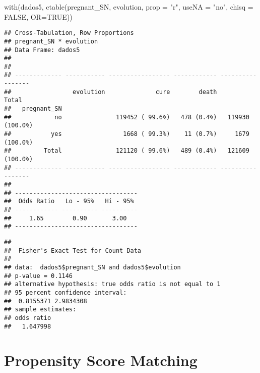\documentclass[
]{article}
\newenvironment{Shaded}{\begin{snugshade}}{\end{snugshade}}
\newcommand{\AttributeTok}[1]{\textcolor[rgb]{0.77,0.63,0.00}{#1}}
\newcommand{\CommentTok}[1]{\textcolor[rgb]{0.56,0.35,0.01}{\textit{#1}}}
\newcommand{\ConstantTok}[1]{\textcolor[rgb]{0.00,0.00,0.00}{#1}}
\newcommand{\FunctionTok}[1]{\textcolor[rgb]{0.00,0.00,0.00}{#1}}
\newcommand{\NormalTok}[1]{#1}
\newcommand{\SpecialCharTok}[1]{\textcolor[rgb]{0.00,0.00,0.00}{#1}}
\newcommand{\StringTok}[1]{\textcolor[rgb]{0.31,0.60,0.02}{#1}}
\begin{document}
\begin{Shaded}
\begin{Highlighting}[]
\FunctionTok{with}\NormalTok{(dados5, }\FunctionTok{ctable}\NormalTok{(pregnant\_SN, evolution, }\AttributeTok{prop =} \StringTok{"r"}\NormalTok{, }\AttributeTok{useNA =} \StringTok{"no"}\NormalTok{, }\AttributeTok{chisq =} \ConstantTok{FALSE}\NormalTok{, }\AttributeTok{OR=}\ConstantTok{TRUE}\NormalTok{))}
\end{Highlighting}
\end{Shaded}

\begin{verbatim}
## Cross-Tabulation, Row Proportions  
## pregnant_SN * evolution  
## Data Frame: dados5  
## 
## 
## ------------- ----------- ----------------- ------------ -----------------
##                 evolution              cure        death             Total
##   pregnant_SN                                                             
##            no               119452 ( 99.6%)   478 (0.4%)   119930 (100.0%)
##           yes                 1668 ( 99.3%)    11 (0.7%)     1679 (100.0%)
##         Total               121120 ( 99.6%)   489 (0.4%)   121609 (100.0%)
## ------------- ----------- ----------------- ------------ -----------------
## 
## ----------------------------------
##  Odds Ratio   Lo - 95%   Hi - 95% 
## ------------ ---------- ----------
##     1.65        0.90       3.00   
## ----------------------------------
\end{verbatim}

\begin{Shaded}
\end{Shaded}

\begin{verbatim}
## 
##  Fisher's Exact Test for Count Data
## 
## data:  dados5$pregnant_SN and dados5$evolution
## p-value = 0.1146
## alternative hypothesis: true odds ratio is not equal to 1
## 95 percent confidence interval:
##  0.8155371 2.9834308
## sample estimates:
## odds ratio 
##   1.647998
\end{verbatim}

\hypertarget{propensity-score-matching}{%
\section{Propensity Score Matching}\label{propensity-score-matching}}
\end{document}
